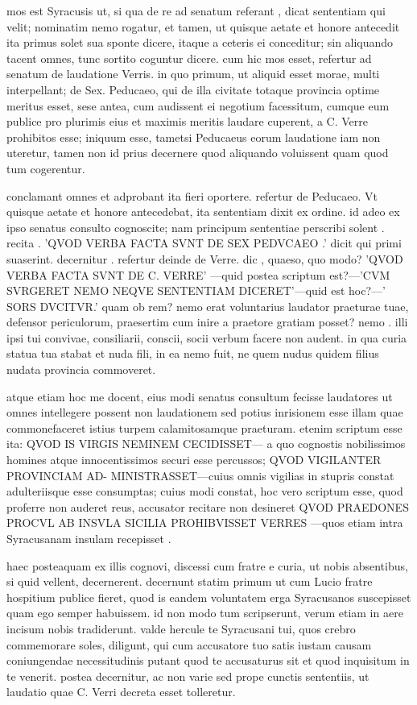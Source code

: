  mos est Syracusis ut, si qua de re ad senatum referant , dicat sententiam qui velit; nominatim nemo rogatur, et tamen, ut quisque aetate et honore antecedit ita primus solet sua sponte dicere, itaque a ceteris ei conceditur; sin aliquando tacent omnes, tunc sortito coguntur dicere. cum hic mos esset, refertur ad senatum de laudatione Verris. in quo primum, ut aliquid esset morae, multi interpellant; de Sex. Peducaeo, qui de illa civitate totaque provincia optime meritus esset, sese antea, cum audissent ei negotium facessitum, cumque eum publice pro plurimis eius et maximis meritis laudare cuperent, a C. Verre prohibitos esse; iniquum esse, tametsi Peducaeus eorum laudatione iam non uteretur, tamen non id prius decernere quod aliquando voluissent quam quod tum cogerentur.

 conclamant omnes et adprobant ita fieri oportere. refertur de Peducaeo. Vt quisque aetate et honore antecedebat, ita sententiam dixit ex ordine. id adeo ex ipso senatus consulto cognoscite; nam principum sententiae perscribi solent . recita . 'QVOD VERBA FACTA SVNT DE SEX PEDVCAEO .' dicit qui primi suaserint. decernitur . refertur deinde de Verre. dic , quaeso, quo modo? 'QVOD VERBA FACTA SVNT DE C. VERRE' —quid postea scriptum est?—'CVM SVRGERET NEMO NEQVE SENTENTIAM DICERET'—quid est hoc?—' SORS DVCITVR.' quam ob rem? nemo erat voluntarius laudator praeturae tuae, defensor periculorum, praesertim cum inire a praetore gratiam posset? nemo . illi ipsi tui convivae, consiliarii, conscii, socii verbum facere non audent. in qua curia statua tua stabat et nuda fili, in ea nemo fuit, ne quem nudus quidem filius nudata provincia commoveret.

 atque etiam hoc me docent, eius modi senatus consultum fecisse laudatores ut omnes intellegere possent non laudationem sed potius inrisionem esse illam quae commonefaceret istius turpem calamitosamque praeturam. etenim scriptum esse ita: QVOD IS VIRGIS NEMINEM CECIDISSET— a quo cognostis nobilissimos homines atque innocentissimos securi esse percussos; QVOD VIGILANTER PROVINCIAM AD- MINISTRASSET—cuius omnis vigilias in stupris constat adulteriisque esse consumptas; cuius modi constat, hoc vero scriptum esse, quod proferre non auderet reus, accusator recitare non desineret QVOD PRAEDONES PROCVL AB INSVLA SICILIA PROHIBVISSET VERRES —quos etiam intra Syracusanam insulam recepisset .

 haec posteaquam ex illis cognovi, discessi cum fratre e curia, ut nobis absentibus, si quid vellent, decernerent. decernunt statim primum ut cum Lucio fratre hospitium publice fieret, quod is eandem voluntatem erga Syracusanos suscepisset quam ego semper habuissem. id non modo tum scripserunt, verum etiam in aere incisum nobis tradiderunt. valde hercule te Syracusani tui, quos crebro commemorare soles, diligunt, qui cum accusatore tuo satis iustam causam coniungendae necessitudinis putant quod te accusaturus sit et quod inquisitum in te venerit. postea decernitur, ac non varie sed prope cunctis sententiis, ut laudatio quae C. Verri decreta esset tolleretur.

